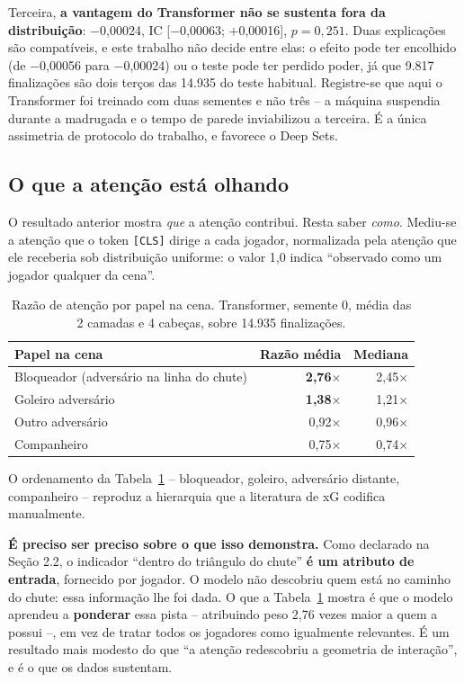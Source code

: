 \documentclass[12pt]{article}
\begin{document}
Terceira, \textbf{a vantagem do Transformer não se sustenta fora da
distribuição}: $-$0,00024, IC [$-$0,00063; $+$0,00016], $p = 0{,}251$. Duas
explicações são compatíveis, e este trabalho não decide entre elas: o efeito
pode ter encolhido (de $-$0,00056 para $-$0,00024) ou o teste pode ter perdido
poder, já que 9.817 finalizações são dois terços das 14.935 do teste habitual.
Registre-se que aqui o Transformer foi treinado com duas sementes e não três --
a máquina suspendia durante a madrugada e o tempo de parede inviabilizou a
terceira. É a única assimetria de protocolo do trabalho, e favorece o Deep Sets.

\subsection{O que a atenção está olhando}

O resultado anterior mostra \emph{que} a atenção contribui. Resta saber
\emph{como}. Mediu-se a atenção que o token \texttt{[CLS]} dirige a cada jogador,
normalizada pela atenção que ele receberia sob distribuição uniforme: o valor 1,0
indica ``observado como um jogador qualquer da cena''.

\begin{table}[ht]
\centering
\caption{Razão de atenção por papel na cena. Transformer, semente 0, média das
2 camadas e 4 cabeças, sobre 14.935 finalizações.}
\label{tab:atencao}
\begin{tabular}{@{}lrr@{}}
\toprule
Papel na cena & Razão média & Mediana \\
\midrule
Bloqueador (adversário na linha do chute) & \textbf{2,76$\times$} & 2,45$\times$ \\
Goleiro adversário & \textbf{1,38$\times$} & 1,21$\times$ \\
Outro adversário & 0,92$\times$ & 0,96$\times$ \\
Companheiro & 0,75$\times$ & 0,74$\times$ \\
\bottomrule
\end{tabular}
\end{table}

O ordenamento da Tabela~\ref{tab:atencao} -- bloqueador, goleiro, adversário
distante, companheiro -- reproduz a hierarquia que a literatura de xG codifica
manualmente.

\textbf{É preciso ser preciso sobre o que isso demonstra.} Como declarado na
Seção 2.2, o indicador ``dentro do triângulo do chute'' \textbf{é um atributo de
entrada}, fornecido por jogador. O modelo não descobriu quem está no caminho do
chute: essa informação lhe foi dada. O que a Tabela~\ref{tab:atencao} mostra é
que o modelo aprendeu a \textbf{ponderar} essa pista -- atribuindo peso 2,76
vezes maior a quem a possui --, em vez de tratar todos os jogadores como
igualmente relevantes. É um resultado mais modesto do que ``a atenção redescobriu
a geometria de interação'', e é o que os dados sustentam.
\end{document}
